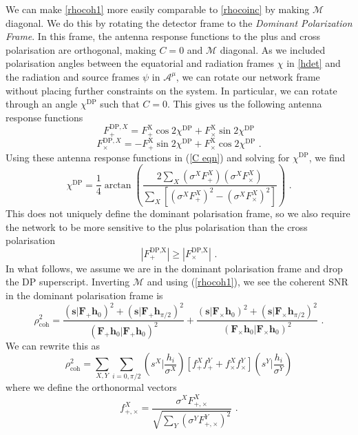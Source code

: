 \documentclass[11pt]{cuthesis}
\newcommand{\fs}{\text{ .}}
\begin{document}
We can make \ref{rhocoh1} more easily comparable to \ref{rhocoinc} by making $\mathcal{M}$ diagonal. We do this by rotating the detector frame to the \textit{Dominant Polarization Frame}. In this frame, the antenna response functions to the plus and cross polarisation are orthogonal, making $C=0$ and $\mathcal{M}$ diagonal. As we included polarisation angles between the equatorial and radiation frames $\chi$ in \ref{hdet} and the radiation and source frames $\psi$ in $\mathcal{A}^\mu$, we can rotate our network frame without placing further constraints on the system. In particular, we can rotate through an angle $\chi^\text{DP}$ such that $C=0$. This gives us the following antenna response functions 
\begin{equation}
F_+^{\text{DP},X} = F_+^\text{X} \cos 2\chi^\text{DP} + F^\text{X}_\times \sin 2\chi^\text{DP}
\end{equation}
\begin{equation}
F_\times^{\text{DP},X} = -F_+^\text{X} \sin 2\chi^\text{DP} + F^\text{X}_\times \cos 2\chi^\text{DP} \fs
\end{equation}
Using these antenna response functions in (\ref{C eqn}) and solving for $\chi^\text{DP}$, we find
\begin{equation}
\chi^\text{DP} = \frac{1}{4} \arctan \left( \frac{2\sum_X (\sigma^X F^X_+)(\sigma^X F^X_\times)}{\sum_X \left[ (\sigma^X F^X_+)^2 - (\sigma^X F^X_\times)^2 \right] }  \right) \fs
\end{equation}
This does not uniquely define the dominant polarisation frame, so we also require the network to be more sensitive to the plus polarisation than the cross polarisation
\begin{equation}
|F^\text{DP,X}_+ | \geq | F^\text{DP,X}_\times | \fs
\end{equation}
In what follows, we assume we are in the dominant polarisation frame and drop the DP superscript. Inverting $\mathcal{M}$ and using (\ref{rhocoh1}), we see the coherent SNR in the dominant polarisation frame is
\begin{equation} \label{rhocoh dof}
\rho_\text{coh}^2 = \frac{(\textbf{s}|\textbf{F}_+ \textbf{h}_0)^2 + (\textbf{s}|\textbf{F}_+ \textbf{h}_{\pi/2})^2}{(\textbf{F}_+\textbf{h}_0|\textbf{F}_+\textbf{h}_0)^2} + \frac{(\textbf{s}|\textbf{F}_\times \textbf{h}_0)^2 + (\textbf{s}|\textbf{F}_\times \textbf{h}_{\pi/2})^2}{(\textbf{F}_\times\textbf{h}_0|\textbf{F}_\times\textbf{h}_0)^2} \fs
\end{equation}
We can rewrite this as
\begin{equation} \label{rhocoh}
\rho_\text{coh}^2 = \sum_{X,Y} \sum_{i=0,\pi/2} \left( s^X \bigg| \frac{h_i}{\sigma^X} \right) [f_+^X f_+^Y + f_\times^X f_\times^Y]  \left( s^Y \bigg| \frac{h_i}{\sigma^Y} \right)
\end{equation}
where we define the orthonormal vectors
\begin{equation}
f^X_{+,\times} = \frac{\sigma^X F^X_{+,\times}}{\sqrt{\sum_Y( \sigma^Y F^Y_{+,\times})^2}} \textbf{ .}
\end{equation}
\end{document}
